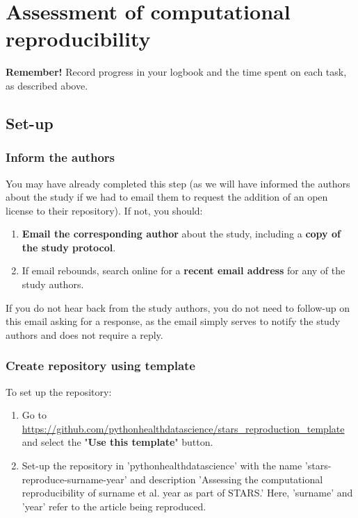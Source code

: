 \section{Assessment of computational reproducibility} \label{sec:reproduce}

\textbf{Remember!} Record progress in your logbook and the time spent on each task, as described above.

\vspace{0.5cm}
\subsection{Set-up}

\subsubsection{Inform the authors}

You may have already completed this step (as we will have informed the authors about the study if we had to email them to request the addition of an open license to their repository). If not, you should:
\begin{enumerate}
    \item \textbf{Email the corresponding author} about the study, including a \textbf{copy of the study protocol}.
    \item If email rebounds, search online for a \textbf{recent email address} for any of the study authors.
\end{enumerate}

If you do not hear back from the study authors, you do not need to follow-up on this email asking for a response, as the email simply serves to notify the study authors and does not require a reply.

\vspace{0.5cm}
\subsubsection{Create repository using template}

To set up the repository:

\begin{enumerate}
    \item Go to \url{https://github.com/pythonhealthdatascience/stars_reproduction_template} and select the "\textbf{Use this template}" button.
    \item Set-up the repository in 'pythonhealthdatascience' with the name 'stars-reproduce-surname-year' and description 'Assessing the computational reproducibility of surname et al. year as part of STARS.' Here, 'surname' and 'year' refer to the article being reproduced.
\end{enumerate}

